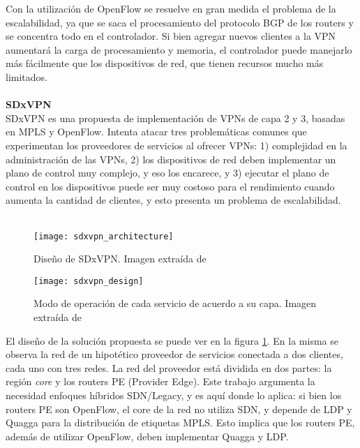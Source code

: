 Con la utilización de OpenFlow se resuelve en gran medida el problema de la escalabilidad, ya que se saca el procesamiento del protocolo BGP de los routers y se concentra todo en el controlador. Si bien agregar nuevos clientes a la VPN aumentará la carga de procesamiento y memoria, el controlador puede manejarlo más fácilmente que los dispositivos de red, que tienen recursos mucho más limitados. \\ \\
\textbf{SDxVPN} \\
SDxVPN \cite{sdxvpn} es una propuesta de implementación de VPNs de capa 2 y 3, basadas en MPLS y OpenFlow. Intenta atacar tres problemáticas comunes que experimentan los proveedores de servicios al ofrecer VPNs: 1) complejidad en la administración de las VPNs, 2) los dispositivos de red deben implementar un plano de control muy complejo, y eso los encarece, y 3) ejecutar el plano de control en los dispositivos puede ser muy costoso para el rendimiento cuando aumenta la cantidad de clientes, y esto presenta un problema de escalabilidad. \\ \\
\begin{figure}[t]
	\caption{Diseño de SDxVPN. Imagen extraída de \cite{sdxvpn}}
	\texttt{[image: sdxvpn\_architecture]}
	\centering
	\label{fig:sdxvpn_architecture}
\end{figure}
\begin{figure}[t]
	\caption{Modo de operación de cada servicio de acuerdo a su capa. Imagen extraída de \cite{sdxvpn}}
	\texttt{[image: sdxvpn\_design]}
	\centering
	\label{fig:sdxvpn_design}
\end{figure}
El diseño de la solución propuesta se puede ver en la figura \ref{fig:sdxvpn_architecture}. En la misma se observa la red de un hipotético proveedor de servicios conectada a dos clientes, cada uno con tres redes. La red del proveedor está dividida en dos partes: la región \textit{core} y los routers PE (Provider Edge). Este trabajo argumenta la necesidad enfoques híbridos SDN/Legacy, y es aquí donde lo aplica: si bien los routers PE son OpenFlow, el core de la red no utiliza SDN, y depende de LDP y Quagga para la distribución de etiquetas MPLS. Esto implica que los routers PE, además de utilizar OpenFlow, deben implementar Quagga y LDP. \\ \\

